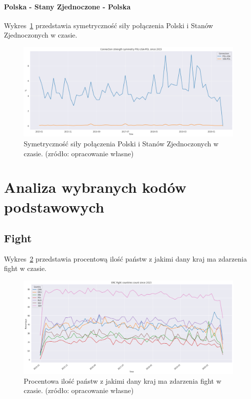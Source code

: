 \documentclass[11pt]{report}
\begin{document}
    \paragraph{Polska - Stany Zjednoczone - Polska}

    Wykres~\ref{fig:POL-USA-POL} przedstawia symetryczność siły połączenia Polski i Stanów Zjednoczonych w czasie.


    \begin{figure}[ht]
        \centering
        \includegraphics[width=1 \textwidth]{fig/ConnectionSymmetry/POL-USA-POL.png}
        \caption{Symetryczność siły połączenia Polski i Stanów Zjednoczonych w czasie. (zródło: opracowanie własne)}
        \label{fig:POL-USA-POL}
    \end{figure}


    \section{Analiza wybranych kodów podstawowych}

    \subsection{Fight}

    Wykres~\ref{fig:Fight} przedstawia procentową ilość państw z jakimi dany kraj ma zdarzenia fight w czasie.


    \begin{figure}[ht]
        \centering
        \includegraphics[width=1 \textwidth]{fig/ERC/Fight.png}
        \caption{Procentowa ilość państw z jakimi dany kraj ma zdarzenia fight w czasie. (zródło: opracowanie własne)}
        \label{fig:Fight}
    \end{figure}
\end{document}

